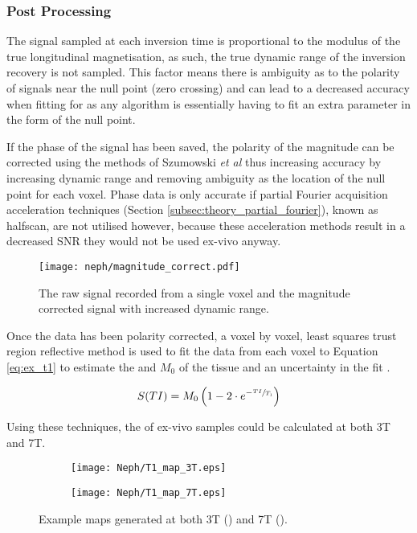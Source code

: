 \subsubsection{Post Processing}

The signal sampled at each inversion time is proportional to the modulus of the true longitudinal magnetisation, as such, the true dynamic range of the inversion recovery is not sampled. This factor means there is ambiguity as to the polarity of signals near the null point (zero crossing) and can lead to a decreased accuracy when fitting for \tone as any algorithm is essentially having to fit an extra parameter in the form of the null point. 

If the phase of the signal has been saved, the polarity of the magnitude can be corrected using the methods of Szumowski \textit{et al} \cite{szumowski_signal_2012} thus increasing accuracy by increasing dynamic range and removing ambiguity as the location of the null point for each voxel. Phase data is only accurate if partial Fourier acquisition acceleration techniques (Section \ref{subsec:theory_partial_fourier}), known as halfscan, are not utilised however, because these acceleration methods result in a decreased \ac{SNR} they would not be used ex-vivo anyway.

\begin{figure}[H]
	\centering
	\texttt{[image: neph/magnitude\_correct.pdf]}
	\caption{The raw signal recorded from a single voxel and the magnitude corrected signal with increased dynamic range.}
	\label{fig:ex_sig_mag_correction}	
\end{figure}

Once the data has been polarity corrected, a voxel by voxel, least squares trust region reflective method is used to fit the data from each voxel to Equation \eqref{eq:ex_t1} to estimate the \tone and $M_0$ of the tissue and an uncertainty in the fit \cite{branch_subspace_1999}.

\begin{equation}
	S(TI) = M_0\left(1-2 \cdot e^{-\sfrac{TI}{T_1}}\right)
	\label{eq:ex_t1}
\end{equation}

Using these techniques, the \tone of ex-vivo samples could be calculated at both 3T and 7T.
 
\begin{figure}[H]
	\centering
	\begin{subfigure}[c]{0.47\textwidth}
		\centering
		\texttt{[image: Neph/T1\_map\_3T.eps]}
		\caption{}
		\label{fig:ex_t1_map_3t}
	\end{subfigure}
	\hfill
	\begin{subfigure}[c]{0.47\textwidth}
		\centering
		\texttt{[image: Neph/T1\_map\_7T.eps]}
		\caption{}
		\label{fig:ex_t1_map_7t}
	\end{subfigure}
	\caption{Example \tone maps generated at both 3T () and 7T ().}
	\label{fig:ex_t1_maps}
\end{figure}

